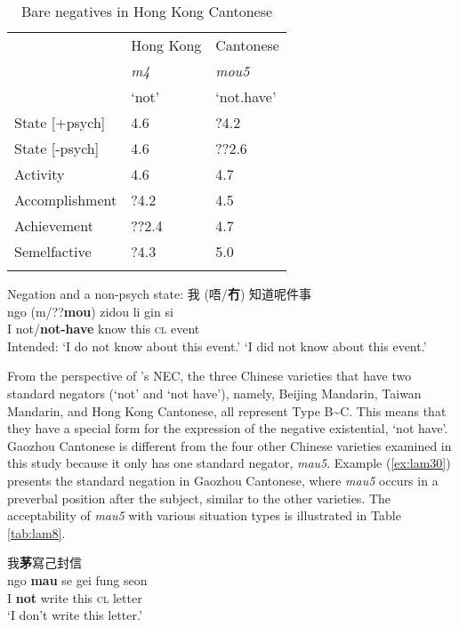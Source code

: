 \documentclass[output=paper]{langscibook}
\begin{document}
\begin{table}
  \begin{tabularx}{\textwidth}{L{2.8cm}XX}
    \lsptoprule
    & Hong Kong & Cantonese\\
    & \textit{m4} & \textit{mou5}\\
    & `not' & `not.have'\\
     \midrule
State [+psych] &  4.6 & ?4.2\\
State [-psych] &  4.6 & ??2.6\\
Activity &  4.6 &  4.7\\
Accomplishment & ?4.2 &  4.5\\
Achievement & ??2.4 &  4.7\\
Semelfactive & ?4.3 &  5.0\\
\lspbottomrule
\end{tabularx}
  \caption{Bare negatives in Hong Kong Cantonese}
  \label{tab:lam7}
\end{table}

\ea Negation and a non-psych state: 我 (唔/\textbf{冇}) 知道呢件事 \label{ex:lam29}\\
	\gll ngo (m/??\textbf{mou}) zidou li	gin	si\\
	I not/\textbf{not-have} know this \textsc{cl} event\\
	\glt Intended: `I do not know about this event.' `I did not know about this event.'
\z

From the perspective of \citeauthor{Croft1991}'s NEC, the three Chinese varieties that have two standard negators (`not' and `not have'), namely, Beijing Mandarin, Taiwan Mandarin, and Hong Kong Cantonese, all represent Type B\sim C. This means that they have a special form for the expression of the negative existential, `not have'. Gaozhou Cantonese is different from the four other Chinese varieties examined in this study because it only has one standard negator, \textit{mau5}. Example (\ref{ex:lam30}) presents the standard negation in Gaozhou Cantonese, where \textit{mau5} occurs in a preverbal position after the subject, similar to the other varieties. The acceptability of \textit{mau5} with various situation types is illustrated in Table \ref{tab:lam8}. 

\ea 我\textbf{茅}寫己封信 \label{ex:lam30}\\
	\gll ngo \textbf{mau} se gei fung seon\\
	I \textbf{not} write this \textsc{cl} letter\\
	\glt `I don't write this letter.'
\z
\end{document}
